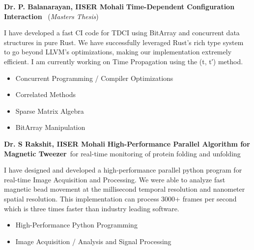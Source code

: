 {%
\textbf{Dr. P. Balanarayan, IISER Mohali}}
	{%
		\textbf{Time-Dependent Configuration Interaction} ~(\emph{Masters Thesis})}
		{%
		I have developed a fast CI code for TDCI using BitArray and concurrent data structures in pure Rust. We have successfully leveraged Rust's rich type system to go beyond LLVM's optimizations, making our implementation extremely efficient. I am currently working on Time Propagation using the (t, t′) method.		
		  \begin{multicols}{2}\raggedright %
			\begin{itemize}
				\item[\circ] Concurrent Programming / Compiler Optimizations
				\item[\circ] Correlated Methods
			  \end{itemize}
		  \columnbreak
		  
		  \begin{itemize}
			\item[\circ] Sparse Matrix Algebra
			\item[\circ] BitArray Manipulation
		  \end{itemize}
		  \columnbreak
		  
		\end{multicols}
		}




{%
\textbf{Dr. S Rakshit, IISER Mohali	}}
	{%
		\textbf{High-Performance Parallel Algorithm for Magnetic Tweezer}~for real-time monitoring of protein folding and unfolding}
		{%
		I have designed and developed a high-performance parallel python program for real-time Image Acquisition and Processing. We were able to analyze fast magnetic bead movement at the millisecond temporal resolution and nanometer spatial resolution. This implementation can process 3000+ frames per second which is three times faster than industry ­leading software.
		\begin{multicols}{2}\raggedright %
			\begin{itemize}
				\item[\circ] High-Performance Python Programming
			  \end{itemize}
		  \columnbreak
		  
		  \begin{itemize}
			\item[\circ] Image Acquisition / Analysis and Signal Processing
		  \end{itemize}
		  \columnbreak
		  
		\end{multicols}
		}


